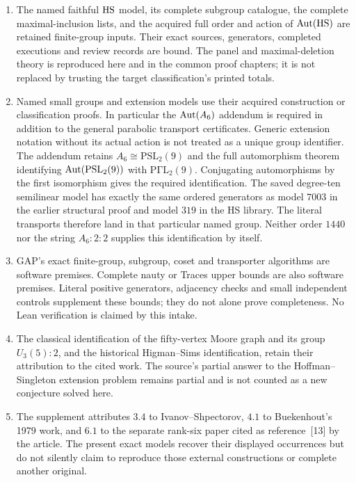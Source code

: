 \begin{enumerate}
\item The named faithful $\mathrm{HS}$ model, its complete subgroup catalogue,
the complete maximal-inclusion lists, and the acquired full order and
action of $\operatorname{Aut}(\mathrm{HS})$ are retained finite-group inputs. Their exact
sources, generators, completed executions and review records are bound.
The panel and maximal-deletion theory is reproduced here and in the
common proof chapters; it is not replaced by trusting the target
classification's printed totals.
\item Named small groups and extension models use their acquired
construction or classification proofs. In particular the
$\operatorname{Aut}(A_6)$ addendum is required in addition to the general parabolic
transport certificates. Generic extension notation without its actual
action is not treated as a unique group identifier.
The addendum retains $A_6\cong\mathrm{PSL}_2(9)$ and the full
automorphism theorem identifying $\operatorname{Aut}(\mathrm{PSL}_2(9))$ with
$\mathrm{P\Gamma L}_2(9)$. Conjugating automorphisms by the first
isomorphism gives the required identification. The saved degree-ten
semilinear model has exactly the same ordered generators as model
$7003$ in the earlier structural proof and model $319$ in the HS
library. The literal transports therefore land in that particular
named group. Neither order $1440$ nor the string $A_6:2:2$ supplies
this identification by itself.
\item GAP's exact finite-group, subgroup, coset and transporter algorithms
are software premises. Complete nauty or Traces upper bounds are also
software premises. Literal positive generators, adjacency checks and
small independent controls supplement these bounds; they do not alone
prove completeness. No Lean verification is claimed by this intake.
\item The classical identification of the fifty-vertex Moore graph and
its group $U_3(5):2$, and the historical Higman--Sims identification,
retain their attribution to the cited work. The source's partial answer
to the Hoffman--Singleton extension problem remains partial and is
not counted as a new conjecture solved here.
\item The supplement attributes $3.4$ to Ivanov--Shpectorov, $4.1$ to
Buekenhout's 1979 work, and $6.1$ to the separate rank-six paper cited
as reference~[13] by the article. The present exact models recover their
displayed occurrences but do not silently claim to reproduce those
external constructions or complete another original.
\end{enumerate}

